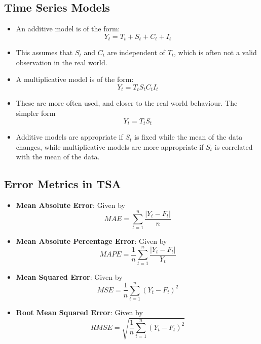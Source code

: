 \documentclass{article}
\theoremstyle{plain}
\theoremstyle{definition}
\begin{document}
\subsection{Time Series Models}
\begin{itemize}
    \item An additive model is of the form:
    \begin{equation*}
        Y_t = T_t + S_t + C_t + I_t
    \end{equation*}
    
    \item This assumes that $S_t$ and $C_t$ are independent of $T_t$, which is often not a valid observation in the real world.
    
    \item A multiplicative model is of the form:
    \begin{equation*}
        Y_t = T_t  S_t  C_t  I_t
    \end{equation*}
    
    \item These are more often used, and closer to the real world behaviour. The simpler form
    \begin{equation*}
        Y_t = T_t  S_t
    \end{equation*}
    
    \item Additive models are appropriate if $S_t$ is fixed while the mean of the data changes, while multiplicative models are more appropriate if $S_t$ is correlated with the mean of the data. 
\end{itemize}

\subsection{Error Metrics in TSA}
\begin{itemize}
    \item \textbf{Mean Absolute Error}: Given by
    \begin{equation*}
        MAE = \sum_{t=1}^{n} \frac{|Y_t - F_t|}{n}
    \end{equation*}
    
    \item \textbf{Mean Absolute Percentage Error}: Given by
    \begin{equation*}
        MAPE = \frac{1}{n} \sum_{t=1}^{n} \frac{|Y_t - F_t|}{Y_t}
    \end{equation*}
    
    \item \textbf{Mean Squared Error}: Given by
    \begin{equation*}
        MSE = \frac{1}{n} \sum_{t=1}^{n} (Y_t - F_t)^2
    \end{equation*}
    
    \item \textbf{Root Mean Squared Error}: Given by
    \begin{equation*}
        RMSE = \sqrt{\frac{1}{n} \sum_{t=1}^{n} (Y_t - F_t)^2}
    \end{equation*}
\end{itemize}
\end{document}

